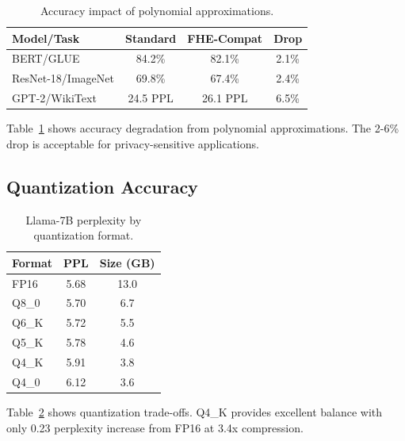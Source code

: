 \begin{table}[h]
\centering
\caption{Accuracy impact of polynomial approximations.}
\label{tab:fhe_acc}
\begin{tabular}{lccc}
\toprule
\textbf{Model/Task} & \textbf{Standard} & \textbf{FHE-Compat} & \textbf{Drop} \\
\midrule
BERT/GLUE & 84.2\% & 82.1\% & 2.1\% \\
ResNet-18/ImageNet & 69.8\% & 67.4\% & 2.4\% \\
GPT-2/WikiText & 24.5 PPL & 26.1 PPL & 6.5\% \\
\bottomrule
\end{tabular}
\end{table}

Table~\ref{tab:fhe_acc} shows accuracy degradation from polynomial approximations. The 2-6\% drop is acceptable for privacy-sensitive applications.

\subsection{Quantization Accuracy}

\begin{table}[h]
\centering
\caption{Llama-7B perplexity by quantization format.}
\label{tab:quant}
\begin{tabular}{lcc}
\toprule
\textbf{Format} & \textbf{PPL} & \textbf{Size (GB)} \\
\midrule
FP16 & 5.68 & 13.0 \\
Q8\_0 & 5.70 & 6.7 \\
Q6\_K & 5.72 & 5.5 \\
Q5\_K & 5.78 & 4.6 \\
Q4\_K & 5.91 & 3.8 \\
Q4\_0 & 6.12 & 3.6 \\
\bottomrule
\end{tabular}
\end{table}

Table~\ref{tab:quant} shows quantization trade-offs. Q4\_K provides excellent balance with only 0.23 perplexity increase from FP16 at 3.4x compression.

